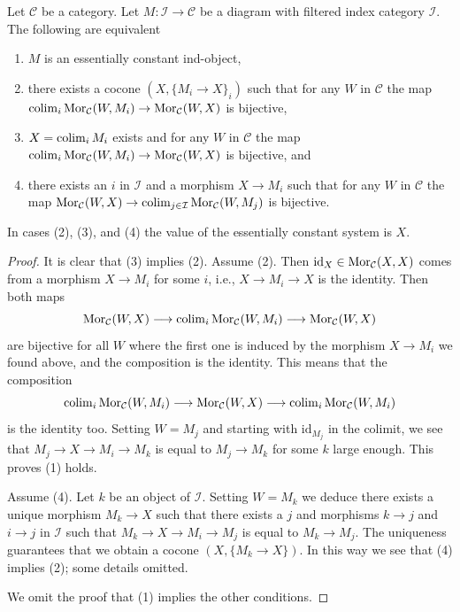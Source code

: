 \begin{lemma}
\label{lemma-characterize-essentially-constant-ind}
Let $\mathcal{C}$ be a category. Let $M : \mathcal{I} \to \mathcal{C}$
be a diagram with filtered index category $\mathcal{I}$.
The following are equivalent
\begin{enumerate}
\item $M$ is an essentially constant ind-object,
\item there exists a cocone $(X, \{M_i \to X\}_i)$ such that for any
$W$ in $\mathcal{C}$ the map
$\mathop{\mathrm{colim}}\nolimits_i \mathop{\mathrm{Mor}}\nolimits_\mathcal{C}(W, M_i) \to \mathop{\mathrm{Mor}}\nolimits_\mathcal{C}(W, X)$
is bijective,
\item $X = \mathop{\mathrm{colim}}\nolimits_i M_i$ exists and for any $W$ in $\mathcal{C}$
the map
$\mathop{\mathrm{colim}}\nolimits_i \mathop{\mathrm{Mor}}\nolimits_\mathcal{C}(W, M_i) \to \mathop{\mathrm{Mor}}\nolimits_\mathcal{C}(W, X)$
is bijective, and
\item there exists an $i$ in $\mathcal{I}$ and a morphism $X \to M_i$
such that for any $W$ in $\mathcal{C}$ the map $\mathop{\mathrm{Mor}}\nolimits_\mathcal{C}(W, X) \to
\mathop{\mathrm{colim}}\nolimits_{j \in \mathcal{I}} \mathop{\mathrm{Mor}}\nolimits_\mathcal{C}(W, M_j)$
is bijective.
\end{enumerate}
In cases (2), (3), and (4) the value of the essentially constant system is $X$.
\end{lemma}

\begin{proof}
It is clear that (3) implies (2). Assume (2).
Then $\text{id}_X \in \mathop{\mathrm{Mor}}\nolimits_\mathcal{C}(X, X)$
comes from a morphism $X \to M_i$ for some $i$, i.e., $X \to M_i \to X$
is the identity. Then both maps
$$
\mathop{\mathrm{Mor}}\nolimits_\mathcal{C}(W, X)
\longrightarrow
\mathop{\mathrm{colim}}\nolimits_i \mathop{\mathrm{Mor}}\nolimits_\mathcal{C}(W, M_i)
\longrightarrow
\mathop{\mathrm{Mor}}\nolimits_\mathcal{C}(W, X)
$$
are bijective for all $W$ where the first one is induced by the morphism
$X \to M_i$ we found above, and the composition is the identity. This means
that the composition
$$
\mathop{\mathrm{colim}}\nolimits_i \mathop{\mathrm{Mor}}\nolimits_\mathcal{C}(W, M_i)
\longrightarrow
\mathop{\mathrm{Mor}}\nolimits_\mathcal{C}(W, X)
\longrightarrow
\mathop{\mathrm{colim}}\nolimits_i \mathop{\mathrm{Mor}}\nolimits_\mathcal{C}(W, M_i)
$$
is the identity too. Setting $W = M_j$ and starting with $\text{id}_{M_j}$
in the colimit, we see that $M_j \to X \to M_i \to M_k$ is equal to
$M_j \to M_k$ for some $k$ large enough. This proves (1) holds.

\medskip\noindent
Assume (4). Let $k$ be an object of $\mathcal{I}$. Setting $W = M_k$
we deduce there exists a unique morphism $M_k \to X$ such that
there exists a $j$ and morphisms $k \to j$ and
$i \to j$ in $\mathcal{I}$ such that $M_k \to X \to M_i \to M_j$
is equal to $M_k \to M_j$. The uniqueness guarantees that we obtain a
cocone $(X, \{M_k \to X\})$. In this way we see that (4) implies (2);
some details omitted.

\medskip\noindent
We omit the proof that (1) implies the other conditions.
\end{proof}

